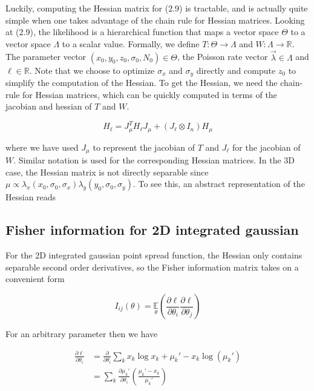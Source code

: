 Luckily, computing the Hessian matrix for (2.9) is tractable, and is actually quite simple when one takes advantage of the chain rule for Hessian matrices. Looking at (2.9), the likelihood is a hierarchical function that maps a vector space $\Theta$ to a vector space $\Lambda$ to a scalar value. Formally, we define $T: \Theta \rightarrow \Lambda$ and $W: \Lambda \rightarrow \mathbb{R}$. The parameter vector $(x_{0},y_{0},z_{0}, \sigma_{0}, N_{0})\in \Theta$, the Poisson rate vector $\vec{\lambda} \in \Lambda$ and $\ell \in \mathbb{R}$. Note that we choose to optimize $\sigma_{x}$ and $\sigma_{y}$ directly and compute $z_{0}$ to simplify the computation of the Hessian. To get the Hessian, we need the chain-rule for Hessian matrices, which can be quickly computed in terms of the jacobian and hessian of $T$ and $W$.


\begin{equation*}
H_{\ell} = J_{\mu}^{T} H_{\ell} J_{\mu} + (J_{\ell}\otimes I_{n})H_{\mu}
\end{equation*}

where we have used $J_{\mu}$ to represent the jacobian of $T$ and $J_{\ell}$ for the jacobian of $W$. Similar notation is used for the corresponding Hessian matrices. 
In the 3D case, the Hessian matrix is not directly separable since $\mu \propto \lambda_{x}(x_{0},\sigma_{0},\sigma_{x})\lambda_{y}(y_{0},\sigma_{0},\sigma_{y})$. To see this, an abstract representation of the Hessian reads 


\subsection{Fisher information for 2D integrated gaussian}

For the 2D integrated gaussian point spread function, the Hessian only contains separable second order derivatives, so the Fisher information matrix takes on a convenient form

\begin{equation}
I_{ij}(\theta) = \underset{\theta}{\mathbb{E}}\left(\frac{\partial \ell}{\partial\theta_{i}}\frac{\partial\ell}{\partial\theta_{j}}\right) 
\end{equation}

For an arbitrary parameter then we have

\begin{align*}
\frac{\partial \ell}{\partial \theta_{i}} &= \frac{\partial}{\partial \theta_{i}} \sum_{k}  x_{k}\log x_{k} + \mu_{k}' - x_{k}\log\left(\mu_{k}'\right)\\
&= \sum_{k} \frac{\partial \mu_{k}'}{\partial\theta_{i}} \left(\frac{\mu_{k}'-x_{k}}{\mu_{k}'}\right)
\end{align*}

